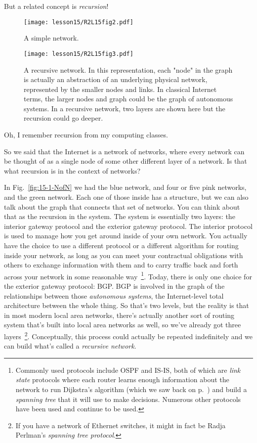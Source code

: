 But a related concept is \emph{recursion}!


\begin{figure}[t]
    \centering
    \texttt{[image: lesson15/R2L15fig2.pdf]}
    \caption[A simple network]{A simple network.}
    \label{fig:15-2-simple}
\end{figure}

\begin{figure}[t]
    \centering
    \texttt{[image: lesson15/R2L15fig3.pdf]}
    \caption[A recursive network]{A recursive network. In this representation, each "node" in the graph is actually an abstraction of an underlying physical network, represented by the smaller nodes and links. In classical Internet terms, the larger nodes and graph could be the graph of autonomous systems.  In a  recursive network, two layers are shown here but the recursion could go deeper.}
    \label{fig:15-3-recursive}
\end{figure}

\mmm Oh, I remember recursion from my computing classes.

So we said that the Internet is a network of networks, where every network can be thought of as a single node of some other different layer of a network. Is that what recursion is in the context of networks?

\rrr In Fig.~\ref{fig:15-1-NofN} we had the blue network, and four or five pink networks, and the green network. Each one of those inside has a structure, but we can also talk about the graph that connects that set of networks. You can think about that as the recursion in the system. The system is essentially two layers: the interior gateway protocol and the exterior gateway protocol. The interior protocol is used to manage how you get around inside of your own network. You actually have the choice to use a different protocol or a different algorithm for routing inside your network, as long as you can meet your contractual obligations with others to exchange information with them and to carry traffic back and forth across your network in some reasonable way~\footnote{Commonly used protocols include OSPF and IS-IS, both of which are \emph{link state} protocols where each router learns enough information about the network to run Dijkstra's algorithm (which we saw back on p.~\pageref{dijkstra}) and build a \emph{spanning tree} that it will use to make decisions. Numerous other protocols have been used and continue to be used.}. Today, there is only one choice for the exterior gateway protocol: BGP. BGP is involved in the graph of the relationships between those \emph{autonomous systems}, the Internet-level total architecture between the whole thing. So that's two levels, but the reality is that in most modern local area networks, there's actually another sort of routing system that's built into local area networks as well, so we've already got three layers~\footnote{If you have a network of Ethernet switches, it might in fact be Radja Perlman's \emph{spanning tree protocol}.}. Conceptually, this process could actually be repeated indefinitely and we can build what's called a \emph{recursive network}.

